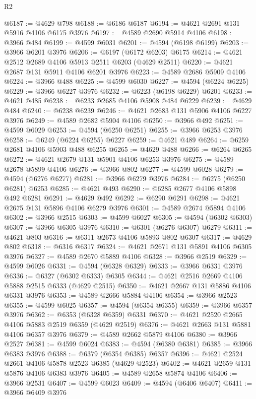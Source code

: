 \begin{lexlean}{R2}
\begin{coremodule}
@6187 := @4629 @798
@6188 := @6186 @6187
@6194 := @4621 @2691 @131 @5916 @4106 @6175 @3976
@6197 := @4589 @2690 @5914 @4106
@6198 := @3966 @484
@6199 := @4599 @6031
@6201 := @4594 (@6198 @6199)
@6203 := @3966 @6201 @3976
@6206 := @6197 (@6172 @6203) @6175
@6214 := @4621 @2512 @2689 @4106 @5913 @2511 @6203 (@4629 @2511)
@6220 := @4621 @2687 @131 @5911 @4106 @6201 @3976
@6223 := @4589 @2686 @5909 @4106
@6224 := @3966 @488
@6225 := @4599 @6030
@6227 := @4594 (@6224 @6225)
@6229 := @3966 @6227 @3976
@6232 := @6223 (@6198 @6229) @6201
@6233 := @4621 @485
@6238 := @6233 @2685 @4106 @5908 @484 @6229
@6239 := @4629 @484
@6240 := @6238 @6239
@6246 := @4621 @2683 @131 @5906 @4106 @6227 @3976
@6249 := @4589 @2682 @5904 @4106
@6250 := @3966 @492
@6251 := @4599 @6029
@6253 := @4594 (@6250 @6251)
@6255 := @3966 @6253 @3976
@6258 := @6249 (@6224 @6255) @6227
@6259 := @4621 @489
@6264 := @6259 @2681 @4106 @5903 @488 @6255
@6265 := @4629 @488
@6266 := @6264 @6265
@6272 := @4621 @2679 @131 @5901 @4106 @6253 @3976
@6275 := @4589 @2678 @5899 @4106
@6276 := @3966 @802
@6277 := @4599 @6028
@6279 := @4594 (@6276 @6277)
@6281 := @3966 @6279 @3976
@6284 := @6275 (@6250 @6281) @6253
@6285 := @4621 @493
@6290 := @6285 @2677 @4106 @5898 @492 @6281
@6291 := @4629 @492
@6292 := @6290 @6291
@6298 := @4621 @2675 @131 @5896 @4106 @6279 @3976
@6301 := @4589 @2674 @5894 @4106
@6302 := @3966 @2515
@6303 := @4599 @6027
@6305 := @4594 (@6302 @6303)
@6307 := @3966 @6305 @3976
@6310 := @6301 (@6276 @6307) @6279
@6311 := @4621 @803
@6316 := @6311 @2673 @4106 @5893 @802 @6307
@6317 := @4629 @802
@6318 := @6316 @6317
@6324 := @4621 @2671 @131 @5891 @4106 @6305 @3976
@6327 := @4589 @2670 @5889 @4106
@6328 := @3966 @2519
@6329 := @4599 @6026
@6331 := @4594 (@6328 @6329)
@6333 := @3966 @6331 @3976
@6336 := @6327 (@6302 @6333) @6305
@6344 := @4621 @2516 @2669 @4106 @5888 @2515 @6333 (@4629 @2515)
@6350 := @4621 @2667 @131 @5886 @4106 @6331 @3976
@6353 := @4589 @2666 @5884 @4106
@6354 := @3966 @2523
@6355 := @4599 @6025
@6357 := @4594 (@6354 @6355)
@6359 := @3966 @6357 @3976
@6362 := @6353 (@6328 @6359) @6331
@6370 := @4621 @2520 @2665 @4106 @5883 @2519 @6359 (@4629 @2519)
@6376 := @4621 @2663 @131 @5881 @4106 @6357 @3976
@6379 := @4589 @2662 @5879 @4106
@6380 := @3966 @2527
@6381 := @4599 @6024
@6383 := @4594 (@6380 @6381)
@6385 := @3966 @6383 @3976
@6388 := @6379 (@6354 @6385) @6357
@6396 := @4621 @2524 @2661 @4106 @5878 @2523 @6385 (@4629 @2523)
@6402 := @4621 @2659 @131 @5876 @4106 @6383 @3976
@6405 := @4589 @2658 @5874 @4106
@6406 := @3966 @2531
@6407 := @4599 @6023
@6409 := @4594 (@6406 @6407)
@6411 := @3966 @6409 @3976

\end{coremodule}
\end{lexlean}
